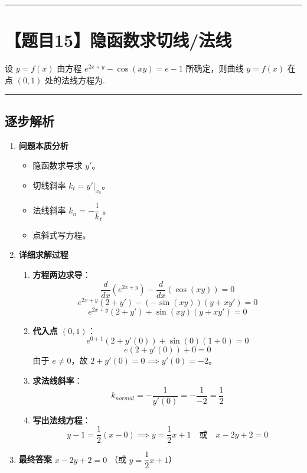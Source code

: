 \documentclass[UTF8,10pt]{ctexart}
\newenvironment{redenv}{\color{red}}{}
\newenvironment{detailedanalysis}{%
    \color{red}
    \begin{enumerate}[label=\textbf{第\arabic*步：}, leftmargin=*, align=left, itemsep=0pt, parsep=0pt, topsep=0pt, partopsep=0pt]
}{%
    \end{enumerate}
}
\newcommand{\problemrule}{\par\filbreak\noindent\rule{\textwidth}{1.5pt}\vspace{-0.5em}}
\newcommand{\analysisrule}{\noindent\rule{\textwidth}{0.8pt}\vspace{-0.5em}}
\begin{document}
\problemrule
\section*{【题目15】隐函数求切线/法线}
设 $y = f(x)$ 由方程 $e^{2x+y} - \cos(xy) = e - 1$ 所确定，则曲线 $y = f(x)$ 在点 $(0,1)$ 处的法线方程为\underline{\hspace{4cm}}.

\begin{redenv}
\analysisrule
\subsection*{逐步解析}

\begin{detailedanalysis}
\item \textbf{问题本质分析}
\begin{itemize}
    \item 隐函数求导求 $y'$。
    \item 切线斜率 $k_t = y'|_{x_0}$。
    \item 法线斜率 $k_n = -\dfrac{1}{k}_t$。
    \item 点斜式写方程。
\end{itemize}

\item \textbf{详细求解过程}
\begin{enumerate}[label=(\alph*)]
    \item \textbf{方程两边求导}：
    \[ \dfrac{d}{dx}(e^{2x+y}) - \dfrac{d}{dx}(\cos(xy)) = 0 \]
    \[ e^{2x+y}(2+y') - (-\sin(xy))(y + xy') = 0 \]
    \[ e^{2x+y}(2+y') + \sin(xy)(y + xy') = 0 \]
    \item \textbf{代入点 $(0,1)$}：
    \[ e^{0+1}(2+y'(0)) + \sin(0)(1 + 0) = 0 \]
    \[ e(2+y'(0)) + 0 = 0 \]
    由于 $e \neq 0$，故 $2 + y'(0) = 0 \implies y'(0) = -2$。
    \item \textbf{求法线斜率}：
    \[ k_{normal} = -\dfrac{1}{y'(0)} = -\dfrac{1}{-2} = \dfrac{1}{2} \]
    \item \textbf{写出法线方程}：
    \[ y - 1 = \dfrac{1}{2}(x - 0) \implies y = \dfrac{1}{2}x + 1 \quad \text{或} \quad x - 2y + 2 = 0 \]
\end{enumerate}

\item \textbf{最终答案}
$x - 2y + 2 = 0$ （或 $y=\dfrac{1}{2}x+1$）
\end{detailedanalysis}


\end{redenv}
\end{document}
